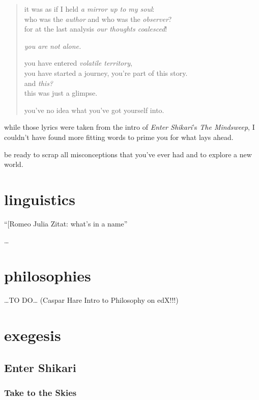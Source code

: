 \documentclass[12pt]{report}
\theoremstyle{definition}
\theoremstyle{remark}
\begin{document}
\begin{quote}
it was as if I held \emph{a mirror up to my soul}:\\
who was the \emph{author} and who was the \emph{observer}?\\
for at the last analysis \emph{our thoughts coalesced}!

\emph{you are not alone.}

you have entered \emph{volatile territory},\\
you have started a journey, you're part of this story.\\
and \emph{this?}\\
this was just a glimpse.

you've no idea what you've got yourself into.\cite{album:es:mindsweep}
\end{quote}

while those lyrics were taken from the intro of \emph{Enter Shikari}'s \emph{The Mindsweep}, I couldn't have found more fitting words to prime you for what lays ahead.

be ready to scrap all misconceptions that you've ever had and to explore a new world.

\section{linguistics}

``[Romeo Julia Zitat: what's in a name''

…

\section{philosophies}

…TO DO… (Caspar Hare Intro to Philosophy on edX!!!)

\section{exegesis}

\subsection{Enter Shikari}

\subsubsection{Take to the Skies}
\end{document}
